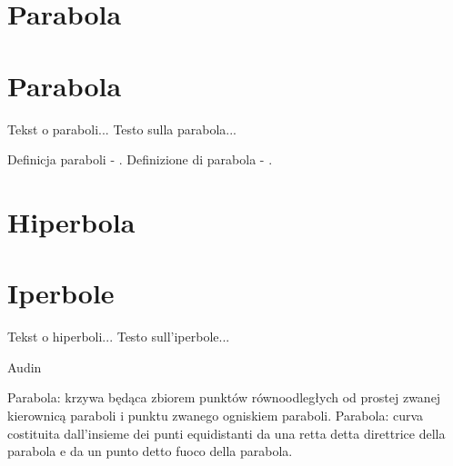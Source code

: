 
\section{Parabola} %
\section{Parabola} %

Tekst o paraboli... %
Testo sulla parabola... %

Definicja paraboli - \cite[s. 247]{hartshorne_2000}. %
Definizione di parabola - \cite[s. 247]{hartshorne_2000}. %

\section{Hiperbola} %
\section{Iperbole} %

Tekst o hiperboli... %
Testo sull'iperbole... %




Audin \cite[s. 183]{audin_2003} %


Parabola: krzywa będąca zbiorem punktów równoodległych od prostej zwanej kierownicą paraboli i punktu zwanego ogniskiem paraboli. %
Parabola: curva costituita dall'insieme dei punti equidistanti da una retta detta direttrice della parabola e da un punto detto fuoco della parabola. %

